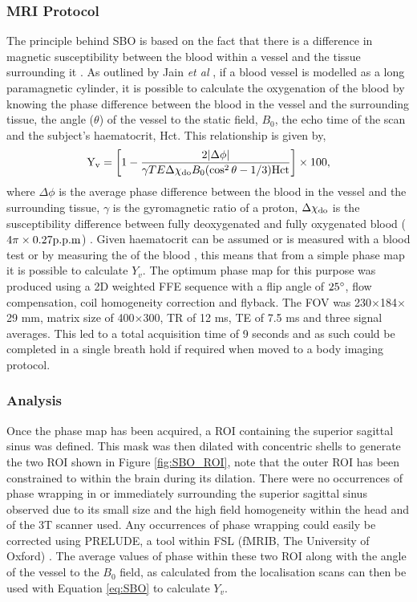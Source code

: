 \subsubsection{\ac{MRI} Protocol}
\label{sec:SBO_prot}
The principle behind \ac{SBO} is based on the fact that there is a difference in magnetic susceptibility between the blood within a vessel and the tissue surrounding it \cite{haacke_vivo_1997}. As outlined by Jain \textit{et al} \cite{jain_mri_2010}, if a blood vessel is modelled as a long paramagnetic cylinder, it is possible to calculate the oxygenation of the blood by knowing the phase difference between the blood in the vessel and the surrounding tissue, the angle ($\theta$) of the vessel to the static field, $B_0$, the echo time of the scan and the subject's haematocrit, Hct. This relationship is given by,
\begin{equation}
\textup{Y}_{\textup{v}} = \left[ 1-\frac{2|\Delta\phi|}{\gamma TE\Delta\chi_{\textup{do}}B_0(\cos^2\theta-1/3)\textup{Hct}}\right]\times 100,
\label{eq:SBO}
\end{equation}
where $\Delta\phi$ is the average phase difference between the blood in the vessel and the surrounding tissue, $\gamma$ is the gyromagnetic ratio of a proton, $\Delta\chi_{\textup{do}}$ is the susceptibility difference between fully deoxygenated and fully oxygenated blood ($4\pi\times0.27\textup{p.p.m}$) \cite{spees_water_2001, jain_investigating_2012}. Given haematocrit can be assumed or is measured with a blood test or by measuring the \tone of the blood \cite{lu_determining_2004}, this means that from a simple phase map it is possible to calculate $Y_v$. The optimum phase map for this purpose was produced using a 2D \tone weighted \ac{FFE} sequence with a flip angle of $25\degree$, flow compensation, coil homogeneity correction and flyback. The \ac{FOV} was 230$\times$184$\times$29 mm, matrix size of 400$\times$300, \ac{TR} of 12 ms, \ac{TE} of 7.5 ms and three signal averages. This led to a total acquisition time of 9 seconds and as such could be completed in a single breath hold if required when moved to a body imaging protocol.

\subsubsection{Analysis}

Once the phase map has been acquired, a \ac{ROI} containing the superior sagittal sinus was defined. This mask was then dilated with concentric shells to generate the two \ac{ROI} shown in Figure \ref{fig:SBO_ROI}, note that the outer \ac{ROI} has been constrained to within the brain during its dilation. There were no occurrences of phase wrapping in or immediately surrounding the superior sagittal sinus observed due to its small size and the high field homogeneity within the head and of the 3T scanner used. Any occurrences of phase wrapping could easily be corrected using \ac{PRELUDE}, a tool within \ac{FSL} (fMRIB, The University of Oxford) \cite{jenkinson_fast_2003}. The average values of phase within these two \ac{ROI} along with the angle of the vessel to the $B_0$ field, as calculated from the localisation scans can then be used with Equation \eqref{eq:SBO} to calculate $Y_v$.

